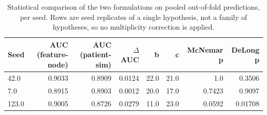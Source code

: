 \begin{table}[t]
\centering
\caption{Statistical comparison of the two formulations on pooled out-of-fold predictions, per seed. Rows are seed replicates of a single hypothesis, not a family of hypotheses, so no multiplicity correction is applied.}
\label{tab:formstats}
\footnotesize
\begin{tabular}{lrrrrrrr}
\toprule
Seed & AUC (feature-node) & AUC (patient-sim) & $\Delta$AUC & b & c & McNemar p & DeLong p \\
\midrule
42.0 & 0.9033 & 0.8909 & 0.0124 & 22.0 & 21.0 & 1.0 & 0.3506 \\
7.0 & 0.8915 & 0.8903 & 0.0012 & 20.0 & 17.0 & 0.7423 & 0.9097 \\
123.0 & 0.9005 & 0.8726 & 0.0279 & 11.0 & 23.0 & 0.0592 & 0.01708 \\
\bottomrule
\end{tabular}
\end{table}
